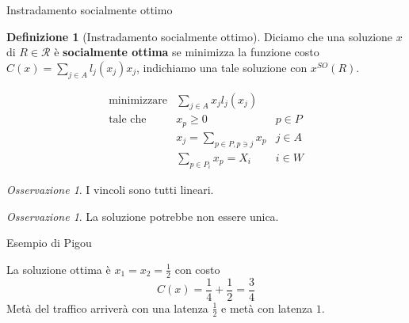 \documentclass{beamer}
\newcounter{counter1}
\theoremstyle{plain}
\theoremstyle{definition}
\newtheorem{mydef}[counter1]{Definizione}
\theoremstyle{remark}
\newtheorem{myoss}[counter1]{Osservazione}
\begin{document}
\begin{frame}{Instradamento socialmente ottimo}
  \begin{mydef}[Instradamento socialmente ottimo]
    Diciamo che una soluzione $x$ di $R \in \mathcal{R}$ è
    \textbf{socialmente ottima} se minimizza la funzione costo
    $C(x) = \sum_{j\in A} l_j(x_j)x_j$, indichiamo una tale soluzione
    con $x^{SO}(R)$.
  \end{mydef}
  \[
    \begin{matrix}
      \text{minimizzare} & \sum _{j\in A} x_j l_j(x_j) \\
      \text{tale che} &   x_p \ge 0 & p\in P \\
      & x_j = \sum_{p\in P,p\ni j} x_p & j\in A \\
      &\sum_{p\in P_i} x_p = X_i & i\in W
    \end{matrix}
  \]
  \begin{myoss}
    I vincoli sono tutti lineari.
  \end{myoss}
  \begin{myoss}
    La soluzione potrebbe non essere unica.
  \end{myoss}
\end{frame}

\begin{frame}{Esempio di Pigou}
  \begin{center}
  \end{center}
  La soluzione ottima è $x_1 = x_2 = \frac{1}{2}$ con costo
  \[ C(x) = \frac{1}{4} + \frac{1}{2} = \frac{3}{4} \]
  Metà del traffico arriverà con una latenza $\frac{1}{2}$ e metà con
  latenza $1$.
\end{frame}
\end{document}
